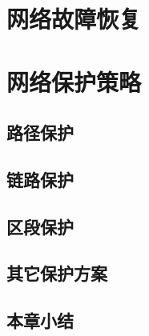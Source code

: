 \section{网络故障恢复}
\section{网络保护策略}
\subsection{路径保护}
\subsection{链路保护}
\subsection{区段保护}
\subsection{其它保护方案}
\subsection{本章小结}

